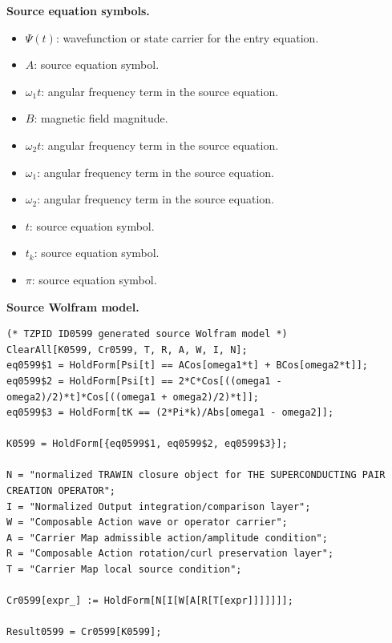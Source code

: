 \begin{minipage}[t]{0.49\linewidth}
\begingroup
\small
\raggedright
\textbf{Source equation symbols.}\par
\begin{itemize}[leftmargin=1.35em,itemsep=1pt,topsep=1pt,parsep=0pt]
    \item $\Psi(t)$: wavefunction or state carrier for the entry equation.
    \item $A$: source equation symbol.
    \item $\omega_1t$: angular frequency term in the source equation.
    \item $B$: magnetic field magnitude.
    \item $\omega_2t$: angular frequency term in the source equation.
    \item $\omega_1$: angular frequency term in the source equation.
    \item $\omega_2$: angular frequency term in the source equation.
    \item $t$: source equation symbol.
    \item $t_k$: source equation symbol.
    \item $\pi$: source equation symbol.
\end{itemize}
\endgroup
\end{minipage}\hfill
\begin{minipage}[t]{0.47\linewidth}
\begingroup
\scriptsize
\raggedright
\textbf{Source Wolfram model.}\par
\begin{Verbatim}[fontsize=\tiny,breaklines=true,breakanywhere=true]
(* TZPID ID0599 generated source Wolfram model *)
ClearAll[K0599, Cr0599, T, R, A, W, I, N];
eq0599$1 = HoldForm[Psi[t] == ACos[omega1*t] + BCos[omega2*t]];
eq0599$2 = HoldForm[Psi[t] == 2*C*Cos[((omega1 - omega2)/2)*t]*Cos[((omega1 + omega2)/2)*t]];
eq0599$3 = HoldForm[tK == (2*Pi*k)/Abs[omega1 - omega2]];

K0599 = HoldForm[{eq0599$1, eq0599$2, eq0599$3}];

N = "normalized TRAWIN closure object for THE SUPERCONDUCTING PAIR CREATION OPERATOR";
I = "Normalized Output integration/comparison layer";
W = "Composable Action wave or operator carrier";
A = "Carrier Map admissible action/amplitude condition";
R = "Composable Action rotation/curl preservation layer";
T = "Carrier Map local source condition";

Cr0599[expr_] := HoldForm[N[I[W[A[R[T[expr]]]]]]];

Result0599 = Cr0599[K0599];
\end{Verbatim}
\endgroup
\end{minipage}


